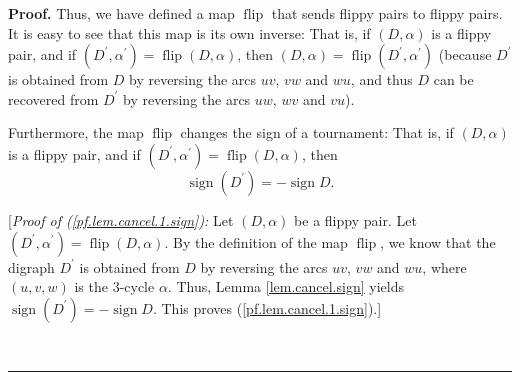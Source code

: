 \documentclass[numbers=enddot,12pt,final,onecolumn,notitlepage]{scrartcl}%
\numberwithin{exer}{subsection}
\theoremstyle{definition}
\newenvironment{proof}[1][Proof]{\noindent\textbf{#1.} }{\ \rule{0.5em}{0.5em}}
\begin{document}
\begin{proof}
Thus, we have defined a map $\operatorname*{flip}$ that sends flippy pairs to
flippy pairs. It is easy to see that this map is its own inverse: That is, if
$\left(  D,\alpha\right)  $ is a flippy pair, and if $\left(  D^{\prime
},\alpha^{\prime}\right)  =\operatorname*{flip}\left(  D,\alpha\right)  $,
then $\left(  D,\alpha\right)  =\operatorname*{flip}\left(  D^{\prime}%
,\alpha^{\prime}\right)  $ (because $D^{\prime}$ is obtained from $D$ by
reversing the arcs $uv$, $vw$ and $wu$, and thus $D$ can be recovered from
$D^{\prime}$ by reversing the arcs $uw$, $wv$ and $vu$).

Furthermore, the map $\operatorname*{flip}$ changes the sign of a tournament:
That is, if $\left(  D,\alpha\right)  $ is a flippy pair, and if $\left(
D^{\prime},\alpha^{\prime}\right)  =\operatorname*{flip}\left(  D,\alpha
\right)  $, then
\begin{equation}
\operatorname*{sign}\left(  D^{\prime}\right)  =-\operatorname*{sign}D.
\label{pf.lem.cancel.1.sign}%
\end{equation}


[\textit{Proof of (\ref{pf.lem.cancel.1.sign}):} Let $\left(  D,\alpha\right)
$ be a flippy pair. Let $\left(  D^{\prime},\alpha^{\prime}\right)
=\operatorname*{flip}\left(  D,\alpha\right)  $. By the definition of the map
$\operatorname*{flip}$, we know that the digraph $D^{\prime}$ is obtained from
$D$ by reversing the arcs $uv$, $vw$ and $wu$, where $\left(  u,v,w\right)  $
is the $3$-cycle $\alpha$. Thus, Lemma \ref{lem.cancel.sign} yields
$\operatorname*{sign}\left(  D^{\prime}\right)  =-\operatorname*{sign}D$. This
proves (\ref{pf.lem.cancel.1.sign}).] \medskip


\end{proof}
\end{document}
